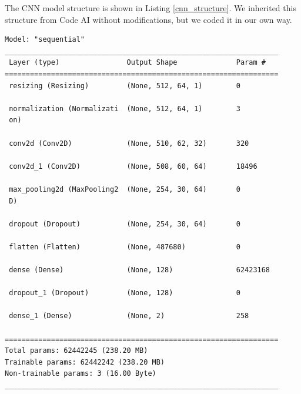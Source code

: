 \documentclass{article}
\begin{document}
    The CNN model structure is shown in Listing \ref{cnn_structure}. We inherited this structure from Code AI without modifications, but we coded it in our own way.
\begin{lstlisting}[caption={CNN model structure}, label={cnn_structure}]
Model: "sequential"
_________________________________________________________________
 Layer (type)                Output Shape              Param #   
=================================================================
 resizing (Resizing)         (None, 512, 64, 1)        0         
                                                                 
 normalization (Normalizati  (None, 512, 64, 1)        3         
 on)                                                             
                                                                 
 conv2d (Conv2D)             (None, 510, 62, 32)       320       
                                                                 
 conv2d_1 (Conv2D)           (None, 508, 60, 64)       18496     
                                                                 
 max_pooling2d (MaxPooling2  (None, 254, 30, 64)       0         
 D)                                                              
                                                                 
 dropout (Dropout)           (None, 254, 30, 64)       0         
                                                                 
 flatten (Flatten)           (None, 487680)            0         
                                                                 
 dense (Dense)               (None, 128)               62423168  
                                                                 
 dropout_1 (Dropout)         (None, 128)               0         
                                                                 
 dense_1 (Dense)             (None, 2)                 258       
                                                                 
=================================================================
Total params: 62442245 (238.20 MB)
Trainable params: 62442242 (238.20 MB)
Non-trainable params: 3 (16.00 Byte)
_________________________________________________________________
\end{lstlisting}
\end{document}
